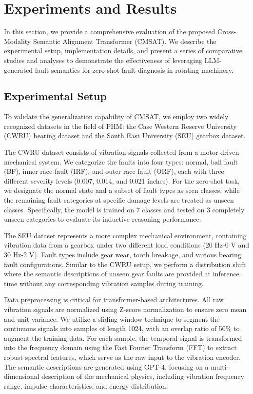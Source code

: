 \section{Experiments and Results}
In this section, we provide a comprehensive evaluation of the proposed Cross-Modality Semantic Alignment Transformer (CMSAT). We describe the experimental setup, implementation details, and present a series of comparative studies and analyses to demonstrate the effectiveness of leveraging LLM-generated fault semantics for zero-shot fault diagnosis in rotating machinery.

\subsection{Experimental Setup}
To validate the generalization capability of CMSAT, we employ two widely recognized datasets in the field of PHM: the Case Western Reserve University (CWRU) bearing dataset and the South East University (SEU) gearbox dataset.

The CWRU dataset \cite{key_cwru_dataset} consists of vibration signals collected from a motor-driven mechanical system. We categorize the faults into four types: normal, ball fault (BF), inner race fault (IRF), and outer race fault (ORF), each with three different severity levels (0.007, 0.014, and 0.021 inches). For the zero-shot task, we designate the normal state and a subset of fault types as seen classes, while the remaining fault categories at specific damage levels are treated as unseen classes. Specifically, the model is trained on 7 classes and tested on 3 completely unseen categories to evaluate its inductive reasoning performance.

The SEU dataset \cite{key_seu_dataset} represents a more complex mechanical environment, containing vibration data from a gearbox under two different load conditions (20 Hz-0 V and 30 Hz-2 V). Fault types include gear wear, tooth breakage, and various bearing fault configurations. Similar to the CWRU setup, we perform a distribution shift where the semantic descriptions of unseen gear faults are provided at inference time without any corresponding vibration samples during training.

Data preprocessing is critical for transformer-based architectures. All raw vibration signals are normalized using Z-score normalization to ensure zero mean and unit variance. We utilize a sliding window technique to segment the continuous signals into samples of length 1024, with an overlap ratio of 50\% to augment the training data. For each sample, the temporal signal is transformed into the frequency domain using the Fast Fourier Transform (FFT) to extract robust spectral features, which serve as the raw input to the vibration encoder. The semantic descriptions are generated using GPT-4, focusing on a multi-dimensional description of the mechanical physics, including vibration frequency range, impulse characteristics, and energy distribution.

